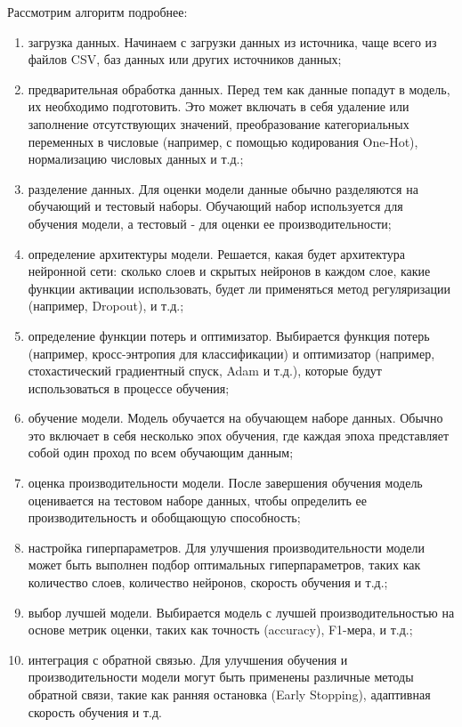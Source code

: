 Рассмотрим алгоритм подробнее:
\begin{enumerate}
    \item загрузка данных. Начинаем с загрузки данных из источника, чаще всего из файлов CSV, баз данных или других источников данных;
    \item предварительная обработка данных. Перед тем как данные попадут в модель, их необходимо подготовить. Это может включать в себя удаление или заполнение отсутствующих значений, преобразование категориальных переменных в числовые (например, с помощью кодирования One-Hot), нормализацию числовых данных и т.д.;
    \item разделение данных. Для оценки модели данные обычно разделяются на обучающий и тестовый наборы. Обучающий набор используется для обучения модели, а тестовый - для оценки ее производительности;
    \item определение архитектуры модели. Решается, какая будет архитектура нейронной сети: сколько слоев и скрытых нейронов в каждом слое, какие функции активации использовать, будет ли применяться метод регуляризации (например, Dropout), и т.д.;
    \item определение функции потерь и оптимизатор. Выбирается функция потерь (например, кросс-энтропия для классификации) и оптимизатор (например, стохастический градиентный спуск, Adam и т.д.), которые будут использоваться в процессе обучения;
    \item обучение модели. Модель обучается на обучающем наборе данных. Обычно это включает в себя несколько эпох обучения, где каждая эпоха представляет собой один проход по всем обучающим данным;
    \item оценка производительности модели. После завершения обучения модель оценивается на тестовом наборе данных, чтобы определить ее производительность и обобщающую способность;
    \item настройка гиперпараметров. Для улучшения производительности модели может быть выполнен подбор оптимальных гиперпараметров, таких как количество слоев, количество нейронов, скорость обучения и т.д.;
    \item выбор лучшей модели. Выбирается модель с лучшей производительностью на основе метрик оценки, таких как точность (accuracy), F1-мера, и т.д.;
    \item интеграция с обратной связью. Для улучшения обучения и производительности модели могут быть применены различные методы обратной связи, такие как ранняя остановка (Early Stopping), адаптивная скорость обучения и т.д.
\end{enumerate}


